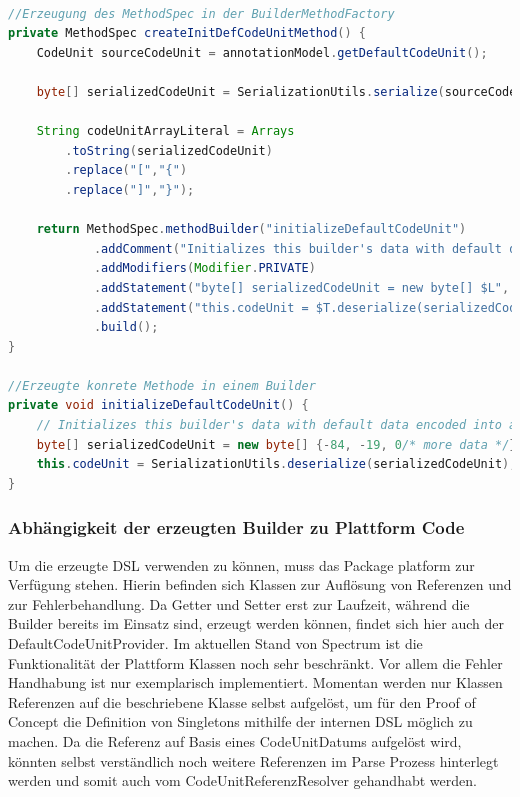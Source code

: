 \documentclass[12pt,oneside,a4paper,parskip]{scrbook}
\begin{document}
\begin{lstlisting}[label=lst:defcu,
language=java,
firstnumber=1,
caption=Quelltext zur Erzeugung des MethodSpecs für die Builder-Methode initializeDefaultCodeUnit und die daraus resultierende konrekte Methode in einem Builder.]

//Erzeugung des MethodSpec in der BuilderMethodFactory
private MethodSpec createInitDefCodeUnitMethod() {
	CodeUnit sourceCodeUnit = annotationModel.getDefaultCodeUnit();

	byte[] serializedCodeUnit = SerializationUtils.serialize(sourceCodeUnit);

	String codeUnitArrayLiteral = Arrays
		.toString(serializedCodeUnit)
		.replace("[","{")
		.replace("]","}");

	return MethodSpec.methodBuilder("initializeDefaultCodeUnit")
			.addComment("Initializes this builder's data with default data encoded into a byte[]")
			.addModifiers(Modifier.PRIVATE)
			.addStatement("byte[] serializedCodeUnit = new byte[] $L", codeUnitArrayLiteral)
			.addStatement("this.codeUnit = $T.deserialize(serializedCodeUnit)", SerializationUtils.class)
			.build();
}

//Erzeugte konrete Methode in einem Builder
private void initializeDefaultCodeUnit() {
	// Initializes this builder's data with default data encoded into a byte[]
	byte[] serializedCodeUnit = new byte[] {-84, -19, 0/* more data */};
	this.codeUnit = SerializationUtils.deserialize(serializedCodeUnit);
}
\end{lstlisting}

\subsubsection{Abhängigkeit der erzeugten Builder zu Plattform Code}

Um die erzeugte DSL verwenden zu können, muss das Package platform zur Verfügung stehen. Hierin befinden sich Klassen zur Auflösung von Referenzen und zur Fehlerbehandlung. Da Getter und Setter erst zur Laufzeit, während die Builder bereits im Einsatz sind, erzeugt werden können, findet sich hier auch der DefaultCodeUnitProvider. Im aktuellen Stand von Spectrum ist die Funktionalität der Plattform Klassen noch sehr beschränkt. Vor allem die Fehler Handhabung ist nur exemplarisch implementiert. Momentan werden nur Klassen Referenzen auf die beschriebene Klasse selbst aufgelöst, um für den Proof of Concept die Definition von Singletons mithilfe der internen DSL möglich zu machen. Da die Referenz auf Basis eines CodeUnitDatums aufgelöst wird, könnten selbst verständlich noch weitere Referenzen im Parse Prozess hinterlegt werden und somit auch vom CodeUnitReferenzResolver gehandhabt werden.
\end{document}
